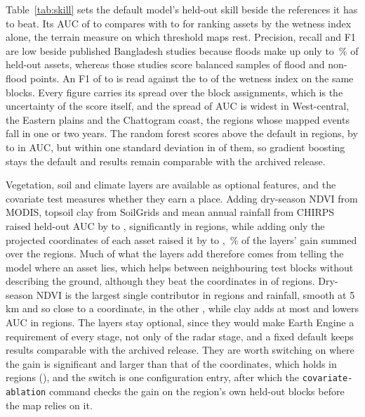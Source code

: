 \documentclass[preprint,12pt]{elsarticle}
\begin{document}
Table~\ref{tab:skill} sets the default model's held-out skill beside the references it has to beat. Its AUC of \NatAUCMin{} to \NatAUCMax{} compares with \NatTWIAUCMin{} to \NatTWIAUCMax{} for ranking assets by the wetness index alone, the terrain measure on which threshold maps rest. Precision, recall and F1 are low beside published Bangladesh studies because floods make up only \NatShareMin{} to \NatShareMax{}\,\% of held-out assets, whereas those studies score balanced samples of flood and non-flood points. An F1 of \NatFOneMin{} to \NatFOneMax{} is read against the \NatTWIFOneMin{} to \NatTWIFOneMax{} of the wetness index on the same blocks. Every figure carries its spread over the block assignments, which is the uncertainty of the score itself, and the spread of AUC is widest in West-central, the Eastern plains and the Chattogram coast, the regions whose mapped events fall in one or two years. The random forest scores above the default in \NatRFAhead{} regions, by \NatRFLeadMin{} to \NatRFLeadMax{} in AUC, but within one standard deviation in \NatRFWithinSD{} of them, so gradient boosting stays the default and results remain comparable with the archived release.

Vegetation, soil and climate layers are available as optional features, and the covariate test measures whether they earn a place. Adding dry-season NDVI from MODIS, topsoil clay from SoilGrids and mean annual rainfall from CHIRPS raised held-out AUC by \NatCovGainMin{} to \NatCovGainMax{}, significantly in \NatCovSignificant{} regions, while adding only the projected coordinates of each asset raised it by \NatXYGainMin{} to \NatXYGainMax{}, \NatXYSharePct{}\,\% of the layers' gain summed over the regions. Much of what the layers add therefore comes from telling the model where an asset lies, which helps between neighbouring test blocks without describing the ground, although they beat the coordinates in \NatCovBeatsXY{} of \NatRegions{} regions. Dry-season NDVI is the largest single contributor in \NatNDVILargest{} regions and rainfall, smooth at 5\,km and so close to a coordinate, in the other \NatRainLargest{}, while clay adds at most \NatClayGainMax{} and lowers AUC in \NatClayNegative{} regions. The layers stay optional, since they would make Earth Engine a requirement of every stage, not only of the radar stage, and a fixed default keeps results comparable with the archived release. They are worth switching on where the gain is significant and larger than that of the coordinates, which holds in \NatCovUseCount{} regions (\NatCovUseRegions{}), and the switch is one configuration entry, after which the \texttt{covariate-ablation} command checks the gain on the region's own held-out blocks before the map relies on it.
\end{document}
